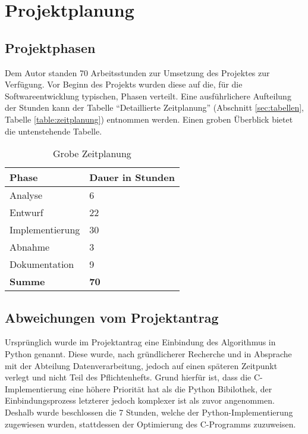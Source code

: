 \section{Projektplanung}
\label{section:projektplanung}
\subsection{Projektphasen}
Dem Autor standen 70 Arbeitsstunden zur Umsetzung des Projektes zur Verfügung.
Vor Beginn des Projekts wurden diese auf die, für die Softwareentwicklung
typischen, Phasen verteilt. Eine ausführlichere Aufteilung der Stunden kann der Tabelle
"`Detaillierte Zeitplanung"' (Abschnitt \ref{sec:tabellen}, Tabelle \ref{table:zeitplanung}) entnommen werden. Einen groben Überblick bietet die untenstehende Tabelle.

\begin{table}[!htp]
    \centering
    \caption{Grobe Zeitplanung}
    \label{table:zeitplanungGrob}
    \begin{tabular}{ll}
        \rowcolor[HTML]{9698ED}
        {\color[HTML]{FFFFFF} \textbf{Phase}} & {\color[HTML]{FFFFFF} \textbf{Dauer in Stunden}} \\ \hline
        Analyse                               & 6                                                \\
        \rowcolor[HTML]{BBDAFF}
        Entwurf                               & 22                                               \\
        Implementierung                       & 30                                               \\
        \rowcolor[HTML]{BBDAFF}
        Abnahme                               & 3                                                \\
        Dokumentation                         & 9                                                \\ \hline
        \rowcolor[HTML]{9698ED}
        {\color[HTML]{FFFFFF} \textbf{Summe}} & {\color[HTML]{FFFFFF} \textbf{70}}
    \end{tabular}
\end{table}

\subsection{Abweichungen vom Projektantrag}
Ursprünglich wurde im Projektantrag eine Einbindung des Algorithmus in
Python genannt. Diese wurde, nach gründlicherer Recherche und in Absprache mit der
Abteilung Datenverarbeitung, jedoch auf einen späteren Zeitpunkt verlegt und nicht
Teil des Pflichtenhefts. Grund hierfür ist, dass die C-Implementierung eine höhere
Priorität hat als die Python Bibilothek, der Einbindungsprozess letzterer jedoch komplexer
ist als zuvor angenommen.
Deshalb wurde beschlossen die 7 Stunden, welche der Python-Implementierung
zugewiesen wurden, stattdessen der Optimierung des C-Programms zuzuweisen.


